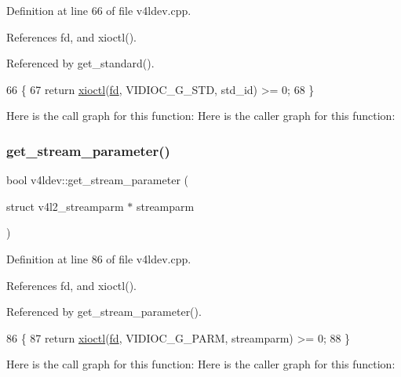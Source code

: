 Definition at line 66 of file v4ldev.\+cpp.



References fd, and xioctl().



Referenced by get\+\_\+standard().


\begin{DoxyCode}
66                                                  \{
67     \textcolor{keywordflow}{return} \hyperlink{classv4ldev_ab93cb1ab18254ca362310b006bd2552d}{xioctl}(\hyperlink{classv4ldev_a2cd44be3be75a19ab8bec12b28e29142}{fd}, VIDIOC\_G\_STD, std\_id) >= 0;
68 \}
\end{DoxyCode}
Here is the call graph for this function\+:
Here is the caller graph for this function\+:
\mbox{\label{classv4ldev_ab8ab5bfdaf0ffe3bcf6638dc7465494b}} 
\subsubsection{\texorpdfstring{get\+\_\+stream\+\_\+parameter()}{get\_stream\_parameter()}\hspace{0.1cm}{\footnotesize\ttfamily [1/2]}}
{\footnotesize\ttfamily bool v4ldev\+::get\+\_\+stream\+\_\+parameter (\begin{DoxyParamCaption}\item[{struct v4l2\+\_\+streamparm $\ast$}]{streamparm }\end{DoxyParamCaption})}



Definition at line 86 of file v4ldev.\+cpp.



References fd, and xioctl().



Referenced by get\+\_\+stream\+\_\+parameter().


\begin{DoxyCode}
86                                                                      \{
87     \textcolor{keywordflow}{return} \hyperlink{classv4ldev_ab93cb1ab18254ca362310b006bd2552d}{xioctl}(\hyperlink{classv4ldev_a2cd44be3be75a19ab8bec12b28e29142}{fd}, VIDIOC\_G\_PARM, streamparm) >= 0;
88 \}
\end{DoxyCode}
Here is the call graph for this function\+:
Here is the caller graph for this function\+:
\mbox{\label{classv4ldev_a8893fba1f5915c2b9a8f6aa6c1e71c52}} 
